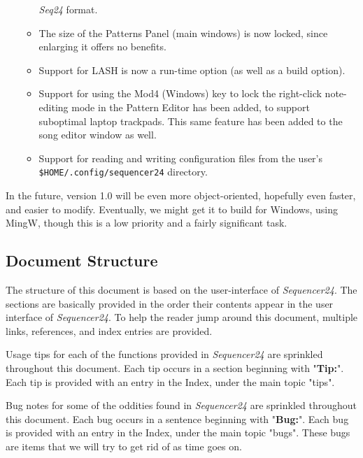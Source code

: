 \documentclass[
 11pt,
 twoside,
 a4paper,
 headinclude,
 footinclude,
 final                                 %
]{article}
\begin{document}
\begin{itemize}
\begin{itemize}
            \textsl{Seq24} format.
         \item The size of the Patterns Panel (main windows) is now locked,
            since enlarging it offers no benefits.
         \item Support for LASH is now a run-time option (as well as a build
            option).
         \item Support for using the Mod4 (Windows) key to lock the
            right-click note-editing mode in the Pattern Editor has been
            added, to support suboptimal laptop trackpads.
            This same feature has been added to the song editor window as well.
         \item Support for reading and writing configuration files from the
            user's \texttt{\$HOME/.config/sequencer24} directory.
      \end{itemize}
   \end{itemize}

   In the future, version 1.0 will be even more object-oriented, hopefully
   even faster, and easier to modify.  Eventually, we might get it to build
   for Windows, using MingW, though this is a low priority and a fairly
   significant task.

\subsection{Document Structure}
\label{subsec:introduction_document_structure}

   The structure of this document is based on the user-interface of
   \textsl{Sequencer24}.  The sections are basically provided in the order
   their contents appear in the user interface of \textsl{Sequencer24}.  To
   help the reader jump around this document, multiple links, references,
   and index entries are provided.

   Usage tips
   for each of the functions provided in
   \textsl{Sequencer24} are sprinkled throughout this document.
   Each tip occurs in a section beginning with "\textbf{Tip:}".
   Each tip is provided with an entry in the Index, under the
   main topic "tips".

   Bug notes
   for some of the oddities found in \textsl{Sequencer24} are
   sprinkled throughout this document.
   Each bug occurs in a sentence beginning with "\textbf{Bug:}".
   Each bug is provided with an entry in the Index, under the
   main topic "bugs".  These bugs are items that we will try to
   get rid of as time goes on.
\end{document}
